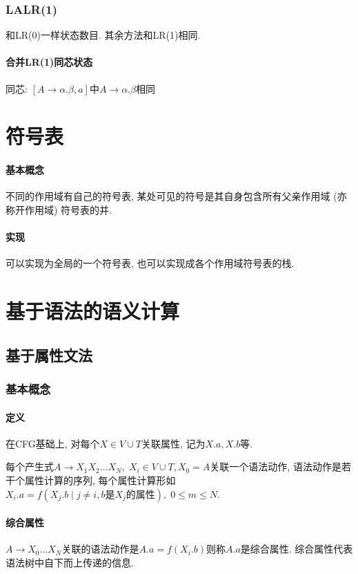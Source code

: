 \documentclass{ctexart}
\begin{document}
\subsubsection{LALR(1)}
    和LR(0)一样状态数目.
    其余方法和LR(1)相同.
\paragraph{合并LR(1)同芯状态} 同芯: $[A\to\alpha.\beta, a]$中$A\to\alpha.\beta$相同


\section{符号表}
\paragraph{基本概念}
    不同的作用域有自己的符号表, 某处可见的符号是其自身包含所有父亲作用域 (亦称开作用域) 符号表的并.
\paragraph{实现} 可以实现为全局的一个符号表, 也可以实现成各个作用域符号表的栈.

\section{基于语法的语义计算}
\subsection{基于属性文法}
\subsubsection{基本概念}
\paragraph{定义}
    在CFG基础上, 对每个$X \in V \cup T$关联属性, 记为$X.a, X.b$等.\par
    每个产生式$A\to X_1 X_2 \ldots X_N,\; X_i \in V \cup T, X_0 = A$关联一个语法动作,
    语法动作是若干个属性计算的序列, 每个属性计算形如$X_i.a = f(X_j.b \;|\; j \neq i, b\text{是}X_j\text{的属性}),\; 0 \le m \le N$.
\paragraph{综合属性} $A \to X_0 \ldots X_N$关联的语法动作是$A.a = f(X_i.b)$则称$A.a$是综合属性.
    综合属性代表语法树中自下而上传递的信息.
\end{document}
